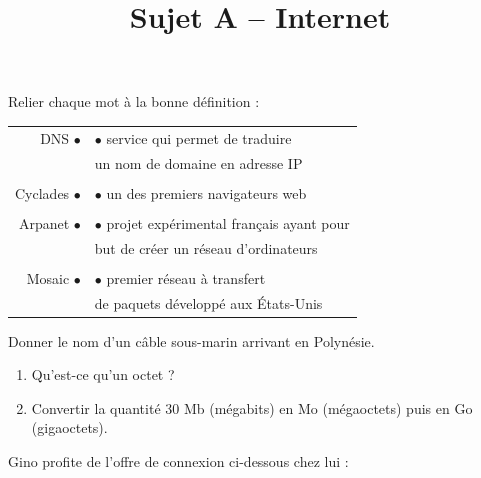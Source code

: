 \documentclass[a4paper]{article}
\begin{document}
\title{Sujet A -- Internet}

\pagestyle{empty}

\date{}
\author{}

\maketitle{}
\thispagestyle{empty}

\exo[1 point] Relier chaque mot à la bonne définition :

\begin{center}
  \begin{tabular}{@{}r@{\hspace{4cm}}l@{}}
    DNS $\bullet$ & $\bullet$ service qui permet de traduire\\
		  & \phantom{$\bullet$} un nom de domaine en adresse IP\\
		  &\\
    Cyclades $\bullet$ & $\bullet$ un des premiers navigateurs web\\
		       &\\
    Arpanet $\bullet$ & $\bullet$ projet expérimental français ayant pour\\
		      & \phantom{$\bullet$} but de créer un réseau d'ordinateurs\\
		      &\\
    Mosaic $\bullet$ & $\bullet$ premier réseau à transfert\\
		     & \phantom{$\bullet$} de paquets développé aux États-Unis\\
  \end{tabular}
\end{center}

\bigskip

\exo[1 point] Donner le nom d'un câble sous-marin arrivant en Polynésie.

\bigskip

\exo[2 points]\vspace*{-2mm}
\begin{enumerate}
  \item Qu'est-ce qu'un octet ?
  \item Convertir la quantité $30$ Mb (mégabits) en Mo (mégaoctets) puis en Go (gigaoctets).
\end{enumerate}

\bigskip

\exo[4 points]\vspace*{-2mm}
Gino profite de l'offre de connexion ci-dessous chez lui :
\end{document}
